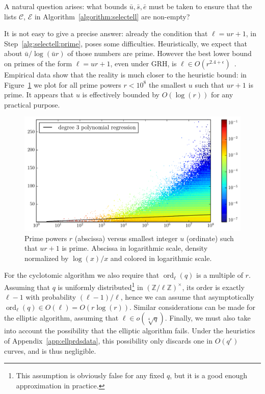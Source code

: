 \documentclass[12pt]{article}
\theoremstyle{plain}
\theoremstyle{definition}
\DeclareMathOperator{\order}{ord} %
\def\Z{\ensuremath{\mathbb{Z}}}
\newcounter{algorithm}
\begin{document}
A natural question arises: what bounds $\bar{u},\bar{s},\bar{e}$ must
be taken to ensure that the lists $\mathcal{C}$, $\mathcal{E}$ in
Algorithm~\ref{algorithm:selectell} are non-empty?

It is not easy to give a precise answer: already the condition that
$\ell=ur+1$, in Step~\ref{alg:selectell:prime}, poses some
difficulties. Heuristically, we expect that about
$\bar{u}/\log(\bar{u}r)$ of those numbers are prime. However the best
lower bound on primes of the form $\ell=ur+1$, even under GRH, is
$\ell\in O(r^{2.4+\epsilon})$~\cite{heath1992zero}. Empirical data
show that the reality is much closer to the heuristic bound: in
Figure~\ref{fig:primes-arith-prog} we plot for all prime powers
$r<10^8$ the smallest $u$ such that $ur+1$ is prime. It appears that
$u$ is effectively bounded by $O(\log(r))$ for any practical purpose.


\begin{figure}
  \centering
  \includegraphics[width=\textwidth]{plots/arith_prog}
  \caption{Prime powers $r$ (abscissa) versus smallest integer $u$
    (ordinate) such that $ur+1$ is prime. Abscissa in logarithmic
    scale, density normalized by $\log(x)/x$ and colored in
    logarithmic scale.}
  \label{fig:primes-arith-prog}
\end{figure}

For the cyclotomic algorithm we also require that $\order_\ell(q)$ is
a multiple of $r$. Assuming that $q$ is uniformly
distributed\footnote{This assumption is obviously false for any fixed
  $q$, but it is a good enough approximation in practice.} in
$(\Z/\ell\Z)^\times$, its order is exactly $\ell-1$ with probability
$(\ell-1)/\ell$, hence we can assume that asymptotically
$\order_\ell(q)\in O(\ell)=O(r\log(r))$. Similar considerations can be
made for the elliptic algorithm, assuming that $\ell\in
o(\sqrt[4]{q})$.
Finally, we must also take into account the possibility that the
elliptic algorithm fails. Under the heuristics of
Appendix~\ref{app:ellprdsdata}, this possibility only discards one in
$O(q^r)$ curves, and is thus negligible.
\end{document}

